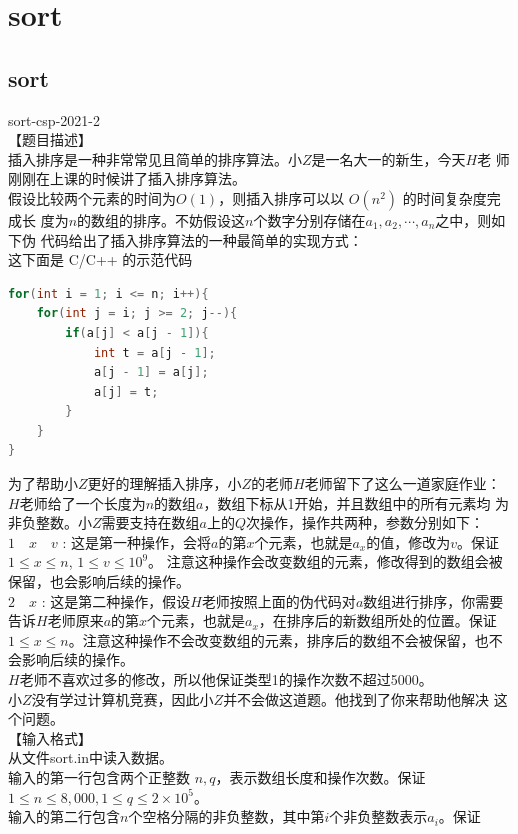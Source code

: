 \documentclass[12pt,twiside,a4paper]{ctexbook}
\numberwithin{chapter}{part}
\begin{document}
\chapter{sort}
\section{sort}
sort-csp-2021-2\\
【题目描述】\\
插入排序是一种非常常见且简单的排序算法。小$Z$是一名大一的新生，今天$H$老
师刚刚在上课的时候讲了插入排序算法。\\
假设比较两个元素的时间为$O(1)$，则插入排序可以以 $O(n^2)$ 的时间复杂度完成长
度为$n$的数组的排序。不妨假设这$n$个数字分别存储在$a_1, a_2, \cdots, a_n$之中，则如下伪
代码给出了插入排序算法的一种最简单的实现方式：\\
这下面是 C/C++ 的示范代码
\begin{lstlisting}[language=C++,breaklines=true]
for(int i = 1; i <= n; i++){
	for(int j = i; j >= 2; j--){
		if(a[j] < a[j - 1]){
			int t = a[j - 1];
			a[j - 1] = a[j];
			a[j] = t;
		}
	}
}
\end{lstlisting}
为了帮助小$Z$更好的理解插入排序，小$Z$的老师$H$老师留下了这么一道家庭作业：\\
$H$老师给了一个长度为$n$的数组$a$，数组下标从1开始，并且数组中的所有元素均
为非负整数。小$Z$需要支持在数组$a$上的$Q$次操作，操作共两种，参数分别如下：\\
$1\quad x\quad v$ : 这是第一种操作，会将$a$的第$x$个元素，也就是$a_x$的值，修改为$v$。保证
$1 \leq x \leq n$, $1 \leq v \leq 10^9$。
注意这种操作会改变数组的元素，修改得到的数组会被保留，也会影响后续的操作。\\
$2\quad x$ : 这是第二种操作，假设$H$老师按照上面的伪代码对$a$数组进行排序，你需要
告诉$H$老师原来$a$的第$x$个元素，也就是$a_x$，在排序后的新数组所处的位置。保证$1\leq x \leq n$。注意这种操作不会改变数组的元素，排序后的数组不会被保留，也不会影响后续的操作。\\
$H$老师不喜欢过多的修改，所以他保证类型1的操作次数不超过5000。\\
小$Z$没有学过计算机竞赛，因此小$Z$并不会做这道题。他找到了你来帮助他解决
这个问题。\\
【输入格式】\\
从文件sort.in中读入数据。\\
输入的第一行包含两个正整数 $n, q$，表示数组长度和操作次数。保证 $1 \leq n \leq
8, 000, 1 \leq q \leq 2 \times 10^5$。\\
输入的第二行包含$n$个空格分隔的非负整数，其中第$i$个非负整数表示$a_i$。保证
\end{document}
